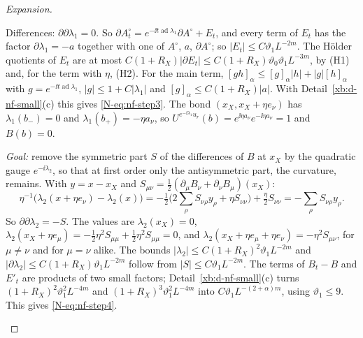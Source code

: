 \begin{proof}[Expansion]
\begin{step}
Differences: $\partial\partial\lambda_1=0$. So $\partial A^\circ_t=e^{-\ii t\operatorname{ad}\lambda_1}\partial A^\circ+E_t$, and every term of $E_t$ has the factor $\partial\lambda_1=-a$ together with one of $A^\circ$, $a$, $\partial A^\circ$; so $|E_t|\le C\vartheta_1L^{-2m}$. The H\"older quotients of $E_t$ are at most $C(1+R_X)|\partial E_t|\le C(1+R_X)\vartheta_0\vartheta_1L^{-3m}$, by (H1) and, for the term with $\eta$, (H2). For the main term, $[gh]_\alpha\le[g]_\alpha|h|+|g|[h]_\alpha$ with $g=e^{-\ii t\operatorname{ad}\lambda_1}$, $|g|\le1+C|\lambda_1|$ and $[g]_\alpha\le C(1+R_X)|a|$. With Detail~\ref{xb:d-nf-small}(c) this gives \eqref{N-eq:nf-step3}. The bond $(x_X,x_X+\eta e_\nu)$ has $\lambda_1(b_-)=0$ and $\lambda_1(b_+)=-\eta a_\nu$, so $U^{e^{-\ii\lambda_1}u_r}(b)=e^{\ii\eta a_\nu}e^{-\ii\eta a_\nu}=1$ and $B(b)=0$.
\end{step}

\begin{step}
\emph{Goal:} remove the symmetric part $S$ of the differences of $B$ at $x_X$ by the quadratic gauge $e^{-\ii\lambda_2}$, so that at first order only the antisymmetric part, the curvature, remains.
With $y=x-x_X$ and $S_{\mu\nu}=\frac12(\partial_\mu B_\nu+\partial_\nu B_\mu)(x_X)$:
\[
\eta^{-1}\big(\lambda_2(x+\eta e_\nu)-\lambda_2(x)\big)=-\tfrac12\Big(2\sum_\rho S_{\nu\rho}y_\rho+\eta S_{\nu\nu}\Big)+\tfrac\eta2S_{\nu\nu}=-\sum_\rho S_{\nu\rho}y_\rho .
\]
So $\partial\partial\lambda_2=-S$. The values are $\lambda_2(x_X)=0$, $\lambda_2(x_X+\eta e_\mu)=-\frac12\eta^2S_{\mu\mu}+\frac12\eta^2S_{\mu\mu}=0$, and $\lambda_2(x_X+\eta e_\mu+\eta e_\nu)=-\eta^2S_{\mu\nu}$, for $\mu\ne\nu$ and for $\mu=\nu$ alike. The bounds $|\lambda_2|\le C(1+R_X)^2\vartheta_1L^{-2m}$ and $|\partial\lambda_2|\le C(1+R_X)\vartheta_1L^{-2m}$ follow from $|S|\le C\vartheta_1L^{-2m}$. The terms of $B_t-B$ and $E'_t$ are products of two small factors; Detail~\ref{xb:d-nf-small}(c) turns $(1+R_X)^2\vartheta_1^2L^{-4m}$ and $(1+R_X)^3\vartheta_1^2L^{-4m}$ into $C\vartheta_1L^{-(2+\alpha)m}$, using $\vartheta_1\le9$. This gives \eqref{N-eq:nf-step4}.
\end{step}


\end{proof}
